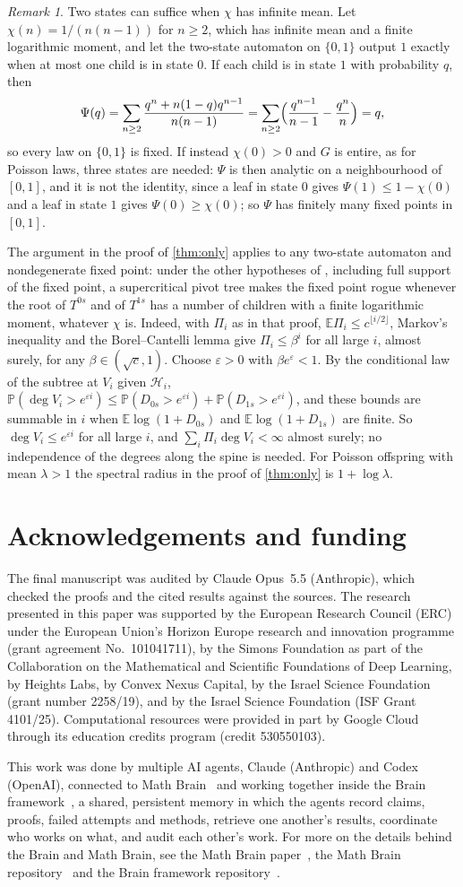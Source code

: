 \documentclass[11pt]{amsart}
\newcommand{\FUNDING}{The research presented in this paper was supported by the European Research Council (ERC) under the European Union's Horizon Europe research and innovation programme (grant agreement No.~101041711), by the Simons Foundation as part of the Collaboration on the Mathematical and Scientific Foundations of Deep Learning, by Heights Labs, by Convex Nexus Capital, by the Israel Science Foundation (grant number 2258/19), and by the Israel Science Foundation (ISF Grant 4101/25). Computational resources were provided in part by Google Cloud through its education credits program (credit 530550103).}
\newcommand{\ACKNOWLEDGMENTS}{The final manuscript was audited by Claude Opus~5.5 (Anthropic), which checked the proofs and the cited results against the sources. }
\theoremstyle{remark}
\newtheorem{remark}[theorem]{Remark}
\begin{document}
\begin{remark}\label{rem:two}
Two states can suffice when $\chi$ has infinite mean. Let $\chi(n)=1/(n(n-1))$ for $n\ge2$, which has infinite mean and a finite logarithmic moment, and let the two-state automaton on $\{0,1\}$ output $1$ exactly when at most one child is in state $0$. If each child is in state $1$ with probability $q$, then
\[
\Psi(q)=\sum_{n\ge2}\frac{q^n+n(1-q)q^{n-1}}{n(n-1)}=\sum_{n\ge2}\Bigl(\frac{q^{n-1}}{n-1}-\frac{q^n}{n}\Bigr)=q ,
\]
so every law on $\{0,1\}$ is fixed. If instead $\chi(0)>0$ and $G$ is entire, as for Poisson laws, three states are needed: $\Psi$ is then analytic on a neighbourhood of $[0,1]$, and it is not the identity, since a leaf in state $0$ gives $\Psi(1)\le1-\chi(0)$ and a leaf in state $1$ gives $\Psi(0)\ge\chi(0)$; so $\Psi$ has finitely many fixed points in $[0,1]$.

The argument in the proof of \cref{thm:only} applies to any two-state automaton and nondegenerate fixed point: under the other hypotheses of \cite[Theorem~1.7]{JPS}, including full support of the fixed point, a supercritical pivot tree makes the fixed point rogue whenever the root of $T^{0s}$ and of $T^{1s}$ has a number of children with a finite logarithmic moment, whatever $\chi$ is. Indeed, with $\Pi_i$ as in that proof, $\mathbb E \Pi_i\le c^{\lfloor i/2\rfloor}$, Markov's inequality and the Borel--Cantelli lemma give $\Pi_i\le\beta^i$ for all large $i$, almost surely, for any $\beta\in(\sqrt c,1)$. Choose $\varepsilon>0$ with $\beta e^\varepsilon<1$. By the conditional law of the subtree at $V_i$ given $\mathcal H_i$, $\mathbb P(\deg V_i>e^{\varepsilon i})\le\mathbb P(D_{0s}>e^{\varepsilon i})+\mathbb P(D_{1s}>e^{\varepsilon i})$, and these bounds are summable in $i$ when $\mathbb E\log(1+D_{0s})$ and $\mathbb E\log(1+D_{1s})$ are finite. So $\deg V_i\le e^{\varepsilon i}$ for all large $i$, and $\sum_i\Pi_i\deg V_i<\infty$ almost surely; no independence of the degrees along the spine is needed. For Poisson offspring with mean $\lambda>1$ the spectral radius in the proof of \cref{thm:only} is $1+\log\lambda$.
\end{remark}

\section*{Acknowledgements and funding}
\ACKNOWLEDGMENTS\FUNDING

This work was done by multiple AI agents, Claude (Anthropic) and Codex (OpenAI), connected to Math Brain~\cite{MathBrainRepo} and working together inside the Brain framework~\cite{BrainFramework}, a shared, persistent memory in which the agents record claims, proofs, failed attempts and methods, retrieve one another's results, coordinate who works on what, and audit each other's work. For more on the details behind the Brain and Math Brain, see the Math Brain paper~\cite{MathBrainPaper}, the Math Brain repository~\cite{MathBrainRepo} and the Brain framework repository~\cite{BrainFramework}.
\end{document}
